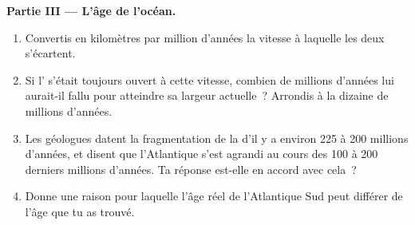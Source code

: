 \begin{problem}
\medskip
\noindent\textbf{Partie III --- L'âge de l'océan.}
\begin{enumerate}[resume]
  \item Convertis en kilomètres par million d'années la vitesse à laquelle
        les deux  s'écartent.
  \item Si l' s'était toujours ouvert à cette vitesse, combien de
        millions d'années lui aurait-il fallu pour atteindre sa largeur
        actuelle~? Arrondis à la dizaine de millions d'années.
  \item Les géologues datent la fragmentation de la  d'il y a environ
        225 à 200 millions d'années, et disent que l'Atlantique s'est
        agrandi au cours des 100 à 200 derniers millions d'années. Ta
        réponse est-elle en accord avec cela~?
  \item Donne une raison pour laquelle l'âge réel de l'Atlantique Sud peut
        différer de l'âge que tu as trouvé.
\end{enumerate}
\end{problem}

